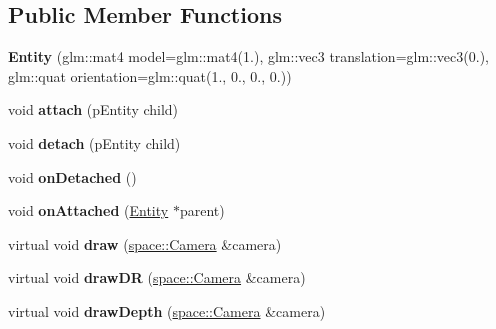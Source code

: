 \subsection*{Public Member Functions}
\begin{DoxyCompactItemize}
\item 
\hypertarget{classfillwave_1_1models_1_1Entity_a9503db95e919c8c0da4bf0a0d2317dde}{}{\bfseries Entity} (glm\+::mat4 model=glm\+::mat4(1.), glm\+::vec3 translation=glm\+::vec3(0.), glm\+::quat orientation=glm\+::quat(1., 0., 0., 0.))\label{classfillwave_1_1models_1_1Entity_a9503db95e919c8c0da4bf0a0d2317dde}

\item 
\hypertarget{classfillwave_1_1models_1_1Entity_a377e85bb6666e808004471721232b7e4}{}void {\bfseries attach} (p\+Entity child)\label{classfillwave_1_1models_1_1Entity_a377e85bb6666e808004471721232b7e4}

\item 
\hypertarget{classfillwave_1_1models_1_1Entity_a8f3d3d1291491ae61930e7159634ccb0}{}void {\bfseries detach} (p\+Entity child)\label{classfillwave_1_1models_1_1Entity_a8f3d3d1291491ae61930e7159634ccb0}

\item 
\hypertarget{classfillwave_1_1models_1_1Entity_ad63db6ab433c1bfba2ec8222a15dd956}{}void {\bfseries on\+Detached} ()\label{classfillwave_1_1models_1_1Entity_ad63db6ab433c1bfba2ec8222a15dd956}

\item 
\hypertarget{classfillwave_1_1models_1_1Entity_af4a59792cf177d095aef718881ede8aa}{}void {\bfseries on\+Attached} (\hyperlink{classfillwave_1_1models_1_1Entity}{Entity} $\ast$parent)\label{classfillwave_1_1models_1_1Entity_af4a59792cf177d095aef718881ede8aa}

\item 
\hypertarget{classfillwave_1_1models_1_1Entity_ab9892968cd70d1abfb8d36660a71865a}{}virtual void {\bfseries draw} (\hyperlink{classfillwave_1_1space_1_1Camera}{space\+::\+Camera} \&camera)\label{classfillwave_1_1models_1_1Entity_ab9892968cd70d1abfb8d36660a71865a}

\item 
\hypertarget{classfillwave_1_1models_1_1Entity_a37b5d9b3aaa361aaf99c4649023314f7}{}virtual void {\bfseries draw\+D\+R} (\hyperlink{classfillwave_1_1space_1_1Camera}{space\+::\+Camera} \&camera)\label{classfillwave_1_1models_1_1Entity_a37b5d9b3aaa361aaf99c4649023314f7}

\item 
\hypertarget{classfillwave_1_1models_1_1Entity_ad49b41494b75d856d60dafcce88737ec}{}virtual void {\bfseries draw\+Depth} (\hyperlink{classfillwave_1_1space_1_1Camera}{space\+::\+Camera} \&camera)\label{classfillwave_1_1models_1_1Entity_ad49b41494b75d856d60dafcce88737ec}


\end{DoxyCompactItemize}
